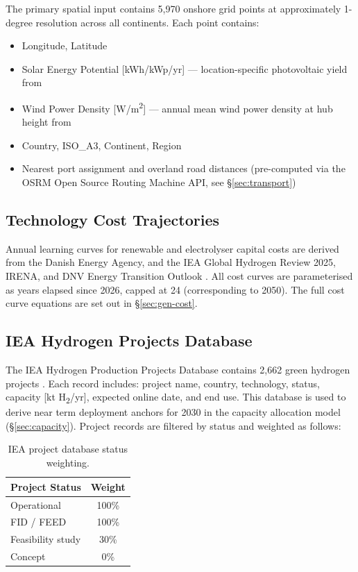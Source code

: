 The primary spatial input contains 5{,}970 onshore grid points at approximately 1-degree resolution across all continents. Each point contains:

\begin{itemize}
    \item Longitude, Latitude
    \item Solar Energy Potential [kWh/kWp/yr] --- location-specific photovoltaic yield from \cite{GSA}
    \item Wind Power Density [W/m\textsuperscript{2}] --- annual mean wind power density at hub height from \cite{GWA}
    \item Country, ISO\_A3, Continent, Region
    \item Nearest port assignment and overland road distances (pre-computed via the OSRM Open Source Routing Machine API, see \S\ref{sec:transport})
\end{itemize}

\subsection{Technology Cost Trajectories}

Annual learning curves for renewable and electrolyser capital costs are derived from the Danish Energy Agency, and the IEA Global Hydrogen Review 2025, IRENA, and DNV Energy Transition Outlook \citep{IEA2026, DNV2025, DEA2026, IRENA2022}. All cost curves are parameterised as years elapsed since 2026, capped at 24 (corresponding to 2050). The full cost curve equations are set out in \S\ref{sec:gen-cost}.

\subsection{IEA Hydrogen Projects Database}

The IEA Hydrogen Production Projects Database contains 2{,}662 green hydrogen projects \citep{IEA2026}. Each record includes: project name, country, technology, status, capacity [kt H\textsubscript{2}/yr], expected online date, and end use. This database is used to derive near term deployment anchors for 2030 in the capacity allocation model (\S\ref{sec:capacity}). Project records are filtered by status and weighted as follows:

\begin{table}[htbp]
    \centering
    \caption{IEA project database status weighting.}
    \label{tab:iea-weights}
    \begin{tabular}{lc}
        \toprule
        Project Status & Weight \\
        \midrule
        Operational & 100\% \\
        FID / FEED  & 100\% \\
        Feasibility study & 30\% \\
        Concept & 0\% \\
        \bottomrule
    \end{tabular}
\end{table}

